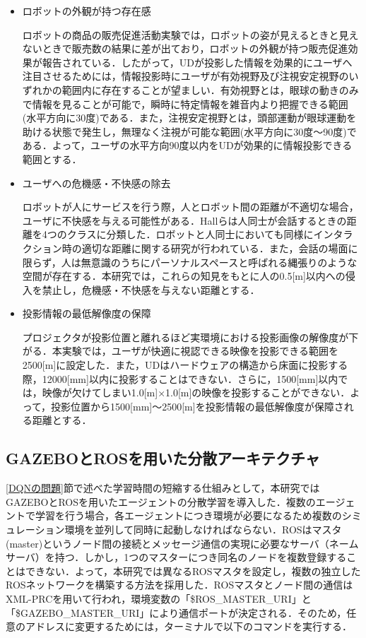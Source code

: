 \documentclass[12pt]{sonota/aislab}
\begin{document}
\begin{itemize}
 \item ロボットの外観が持つ存在感
    
    ロボットの商品の販売促進活動実験\cite{販売促進}では，ロボットの姿が見えるときと見えないときで販売数の結果に差が出ており，ロボットの外観が持つ販売促進効果が報告されている．したがって，UDが投影した情報を効果的にユーザへ注目させるためには，情報投影時にユーザが有効視野及び注視安定視野のいずれかの範囲内に存在することが望ましい．有効視野とは，眼球の動きのみで情報を見ることが可能で，瞬時に特定情報を雑音内より把握できる範囲(水平方向に30度)である．また，注視安定視野とは，頭部運動が眼球運動を助ける状態で発生し，無理なく注視が可能な範囲(水平方向に30度〜90度)である．よって，ユーザの水平方向90度以内をUDが効果的に情報投影できる範囲とする．
    
 \item ユーザへの危機感・不快感の除去
 
    ロボットが人にサービスを行う際，人とロボット間の距離が不適切な場合，ユーザに不快感を与える可能性がある．Hallらは人同士が会話するときの距離を4つのクラスに分類した\cite{Hall}．ロボットと人同士においても同様にインタラクション時の適切な距離に関する研究が行われている\cite{proximity}．また，会話の場面に限らず，人は無意識のうちにパーソナルスペースと呼ばれる縄張りのような空間が存在する．本研究では，これらの知見をもとに人の0.5[m]以内への侵入を禁止し，危機感・不快感を与えない距離とする．
 
 \item 投影情報の最低解像度の保障
 
    プロジェクタが投影位置と離れるほど実環境における投影画像の解像度が下がる．本実験では，ユーザが快適に視認できる映像を投影できる範囲を2500[m]に設定した．また，UDはハードウェアの構造から床面に投影する際，12000[mm]以内に投影することはできない．さらに，1500[mm]以内では，映像が欠けてしまい1.0[m]×1.0[m]の映像を投影することができない．よって，投影位置から1500[mm]〜2500[m]を投影情報の最低解像度が保障される距離とする．
\end{itemize}


\subsection{GAZEBOとROSを用いた分散アーキテクチャ}
\ref{DQNの問題}節で述べた学習時間の短縮する仕組みとして，本研究ではGAZEBOとROSを用いたエージェントの分散学習を導入した．複数のエージェントで学習を行う場合，各エージェントにつき環境が必要になるため複数のシミュレーション環境を並列して同時に起動しなければならない．ROSはマスタ(master)というノード間の接続とメッセージ通信の実現に必要なサーバ（ネームサーバ）を持つ．しかし，1つのマスターにつき同名のノードを複数登録することはできない．よって，本研究では異なるROSマスタを設定し，複数の独立したROSネットワークを構築する方法を採用した．ROSマスタとノード間の通信はXML-PRCを用いて行われ，環境変数の「\$ROS\_MASTER\_URI」と「\$GAZEBO\_MASTER\_URI」により通信ポートが決定される．そのため，任意のアドレスに変更するためには，ターミナルで以下のコマンドを実行する．
\end{document}
